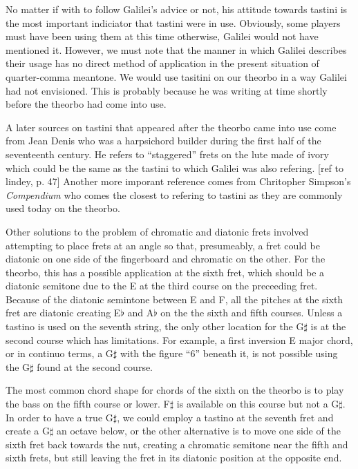 No matter if with to follow Galilei's advice or not, his attitude towards tastini is the
most important indiciator that tastini were in use.  Obviously, some players must have
been using them at this time otherwise, Galilei would not have mentioned it.  However, we
must note that the manner in which Galilei describes their usage has no direct method of
application in the present situation of quarter-comma meantone.  We would use tasitini on
our theorbo in a way Galilei had not envisioned.  This is probably because he was writing
at time shortly before the theorbo had come into use.

A later sources on tastini that appeared after the theorbo came into use come from Jean
Denis who was a harpsichord builder during the first half of the seventeenth century. He
refers to ``staggered'' frets on the lute made of ivory which could be the same as the
tastini to which Galilei was also refering. [ref to lindey, p. 47]  Another more imporant
reference comes from Chritopher Simpson's \textit{Compendium} who comes the closest to
refering to tastini as they are commonly used today on the theorbo.




Other solutions to the problem of chromatic and diatonic frets involved attempting to
place frets at an angle so that, presumeably, a fret could be diatonic on one side of the
fingerboard and chromatic on the other.  For the theorbo, this has a possible application
at the sixth fret, which should be a diatonic semitone due to the E at the third course on
the preceeding fret. Because of the diatonic semintone between E and F, all the pitches at
the sixth fret are diatonic creating E$\flat$ and A$\flat$ on the the sixth and fifth
courses.  Unless a tastino is used on the seventh string, the only other location for the
G$\sharp$ is at the second course which has limitations.  For example, a first inversion E
major chord, or in continuo terms, a G$\sharp$ with the figure ``6'' beneath it, is not
possible using the G$\sharp$ found at the second course.

The most common chord shape for chords of the sixth on the theorbo is to play the bass on
the fifth course or lower.  F$\sharp$ is available on this course but not a G$\sharp$.  In
order to have a true G$\sharp$, we could employ a tastino at the seventh fret and create a
G$\sharp$ an octave below, or the other alternative is to move one side of the sixth fret
back towards the nut, creating a chromatic semitone near the fifth and sixth frets, but
still leaving the fret in its diatonic position at the opposite end.

